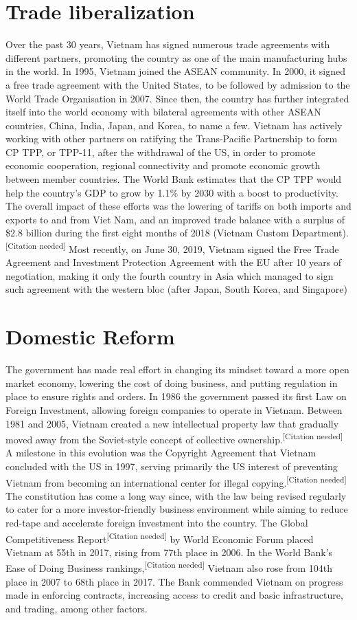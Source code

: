 \documentclass[openany]{book}
\begin{document}
\section{Trade liberalization}
\small{
Over the past 30 years, Vietnam has signed numerous trade agreements with different partners, promoting the country as one of the main manufacturing hubs in the world. In 1995, Vietnam joined the ASEAN community. In 2000, it signed a free trade agreement with the United States, to be followed by admission to the World Trade Organisation in 2007. Since then, the country has further integrated itself into the world economy with bilateral agreements with other ASEAN countries, China, India, Japan, and Korea, to name a few. Vietnam has actively working with other partners on ratifying the Trans-Pacific Partnership to form CP TPP, or TPP-11, after the withdrawal of the US, in order to promote economic cooperation, regional connectivity and promote economic growth between member countries. The World Bank estimates that the CP TPP would help the country's GDP to grow by 1.1\% by 2030 with a boost to productivity. The overall impact of these efforts was the lowering of tariffs on both imports and exports to and from Viet Nam, and an improved trade balance with a surplus of \$2.8 billion during the first eight months of 2018 (Vietnam Custom Department).\textsuperscript{[Citation needed]} Most recently, on June 30, 2019, Vietnam signed the Free Trade Agreement and Investment Protection Agreement with the EU after 10 years of negotiation, making it only the fourth country in Asia which managed to sign such agreement with the western bloc (after Japan, South Korea, and Singapore)
}
\section{Domestic Reform}
The government has made real effort in changing its mindset toward a more open market economy, lowering the cost of doing business, and putting regulation in place to ensure rights and orders. In 1986 the government passed its first Law on Foreign Investment, allowing foreign companies to operate in Vietnam. Between 1981 and 2005, Vietnam created a new intellectual property law that gradually moved away from the Soviet-style concept of collective ownership.\textsuperscript{[Citation needed]} A milestone in this evolution was the Copyright Agreement that Vietnam concluded with the US in 1997, serving primarily the US interest of preventing Vietnam from becoming an international center for illegal copying.\textsuperscript{[Citation needed]} The constitution has come a long way since, with the law being revised regularly to cater for a more investor-friendly business environment while aiming to reduce red-tape and accelerate foreign investment into the country. The Global Competitiveness Report\textsuperscript{[Citation needed]} by World Economic Forum placed Vietnam at 55th in 2017, rising from 77th place in 2006. In the World Bank's Ease of Doing Business rankings,\textsuperscript{[Citation needed]} Vietnam also rose from 104th place in 2007 to 68th place in 2017. The Bank commended Vietnam on progress made in enforcing contracts, increasing access to credit and basic infrastructure, and trading, among other factors.
\end{document}
